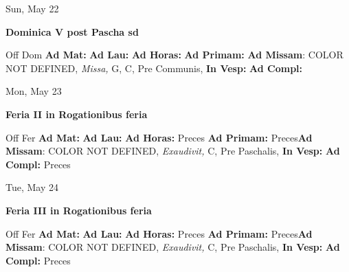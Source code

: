 \documentclass[10pt]{book}
\begin{document}
\begin{center}
\begin{minipage}{3.5in}
\vspace{2em}
\begin{center}Sun, May 22
\end{center}
\textbf{ \large Dominica V post Pascha
\textnormal{\normalsize sd}}

\begin{justify}Off Dom
\textbf{Ad Mat: }
\textbf{Ad Lau: }
\textbf{Ad Horas: }
\textbf{Ad Primam: }\textbf{Ad Missam}: COLOR NOT DEFINED, \textit{Missa,} G, C, Pre Communis, 
\textbf{In Vesp: }
\textbf{Ad Compl: }
\end{justify}
\end{minipage}
\end{center}

\begin{center}
\begin{minipage}{3.5in}
\vspace{2em}
\begin{center}Mon, May 23
\end{center}
\textbf{ \large Feria II in Rogationibus
\textnormal{\normalsize feria}}

\begin{justify}Off Fer
\textbf{Ad Mat: }
\textbf{Ad Lau: }
\textbf{Ad Horas: }Preces
\textbf{Ad Primam: }Preces\textbf{Ad Missam}: COLOR NOT DEFINED, \textit{Exaudivit,} C, Pre Paschalis, 
\textbf{In Vesp: }
\textbf{Ad Compl: }Preces
\end{justify}
\end{minipage}
\end{center}

\begin{center}
\begin{minipage}{3.5in}
\vspace{2em}
\begin{center}Tue, May 24
\end{center}
\textbf{ \large Feria III in Rogationibus
\textnormal{\normalsize feria}}

\begin{justify}Off Fer
\textbf{Ad Mat: }
\textbf{Ad Lau: }
\textbf{Ad Horas: }Preces
\textbf{Ad Primam: }Preces\textbf{Ad Missam}: COLOR NOT DEFINED, \textit{Exaudivit,} C, Pre Paschalis, 
\textbf{In Vesp: }
\textbf{Ad Compl: }Preces
\end{justify}
\end{minipage}
\end{center}
\end{document}
